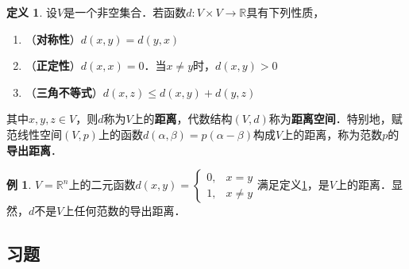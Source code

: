 \documentclass[a4paper,fontset=windows]{ctexbook}
\theoremstyle{definition}
\newtheorem{definition}{定义}[chapter]
\newtheorem{example}{例}[chapter]
\renewcommand{\le}{\leqslant}
\begin{document}
\begin{definition}\label{def10.5}
设$V$是一个非空集合．若函数$d:V\times V\to\mathbb{R}$具有下列性质，
\begin{enumerate}
\item（{\bf 对称性}）$d(x,y)=d(y,x)$

\item（{\bf 正定性}）$d(x,x)=0$．当$x\ne y$时，$d(x,y)>0$

\item（{\bf 三角不等式}）$d(x,z)\le d(x,y)+d(y,z)$
\end{enumerate}
其中$x,y,z\in V$，则$d$称为$V$上的{\bf 距离}，代数结构$(V,d)$称为{\bf 距离空间}．特别地，赋范线性空间$(V,p)$上的函数$d(\alpha,\beta)=p(\alpha-\beta)$构成$V$上的距离，称为范数$p$的{\bf 导出距离}．
\end{definition}

\begin{example}
$V=\mathbb{R}^n$上的二元函数$d(x,y)=\begin{cases}0,&x=y \\ 1,&x\ne y\end{cases}$满足定义\ref{def10.5}，是$V$上的距离．显然，$d$不是$V$上任何范数的导出距离．
\end{example}

\subsection*{习题}
\end{document}
